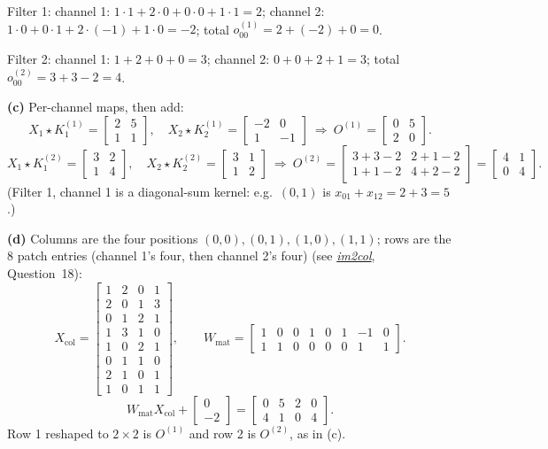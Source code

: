 \documentclass[12pt,a4paper]{article}
\newcommand{\seeconcept}[3]{(see \hyperref[#1]{\textit{#2}}, Question~#3)}
\begin{document}
Filter 1: channel 1: $1\cdot1+2\cdot0+0\cdot0+1\cdot1=2$; channel 2: $1\cdot0+0\cdot1+2\cdot(-1)+1\cdot0=-2$; total $o^{(1)}_{00}=2+(-2)+0=0$.

Filter 2: channel 1: $1+2+0+0=3$; channel 2: $0+0+2+1=3$; total $o^{(2)}_{00}=3+3-2=4$.

\textbf{(c)} Per-channel maps, then add:
\[
X_1\star K^{(1)}_1=\begin{bmatrix}2&5\\1&1\end{bmatrix},\quad X_2\star K^{(1)}_2=\begin{bmatrix}-2&0\\1&-1\end{bmatrix}\ \Rightarrow\ O^{(1)}=\begin{bmatrix}0&5\\2&0\end{bmatrix}.
\]
\[
X_1\star K^{(2)}_1=\begin{bmatrix}3&2\\1&4\end{bmatrix},\quad X_2\star K^{(2)}_2=\begin{bmatrix}3&1\\1&2\end{bmatrix}\ \Rightarrow\ O^{(2)}=\begin{bmatrix}3+3-2&2+1-2\\1+1-2&4+2-2\end{bmatrix}=\begin{bmatrix}4&1\\0&4\end{bmatrix}.
\]
(Filter 1, channel 1 is a diagonal-sum kernel: e.g.\ $(0,1)$ is $x_{01}+x_{12}=2+3=5$.)

\textbf{(d)} Columns are the four positions $(0,0),(0,1),(1,0),(1,1)$; rows are the 8 patch entries (channel 1's four, then channel 2's four) \seeconcept{c:im2col}{im2col}{18}:
\[
X_{\text{col}}=\begin{bmatrix}
1&2&0&1\\2&0&1&3\\0&1&2&1\\1&3&1&0\\
1&0&2&1\\0&1&1&0\\2&1&0&1\\1&0&1&1
\end{bmatrix},\qquad
W_{\text{mat}}=\begin{bmatrix}1&0&0&1&0&1&-1&0\\1&1&0&0&0&0&1&1\end{bmatrix}.
\]
\[
W_{\text{mat}}X_{\text{col}}+\begin{bmatrix}0\\-2\end{bmatrix}=\begin{bmatrix}0&5&2&0\\4&1&0&4\end{bmatrix}.
\]
Row 1 reshaped to $2\times2$ is $O^{(1)}$ and row 2 is $O^{(2)}$, as in (c).
\end{document}
